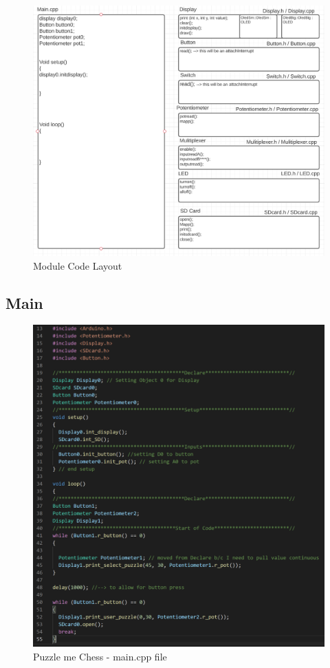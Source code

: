 \documentclass[11pt]{article}
\begin{document}
\begin{figure}
  \includegraphics[width=\linewidth]{./Pics/code_layout.PNG}
  \caption{Module Code Layout}
  \label{fig:MCL1}
\end{figure}

\subsection{Main}

\begin{figure}
  \includegraphics[width=\linewidth]{./Pics/maincpp.PNG}
  \caption{Puzzle me Chess - main.cpp file}
  \label{fig:main}
\end{figure}
\end{document}
